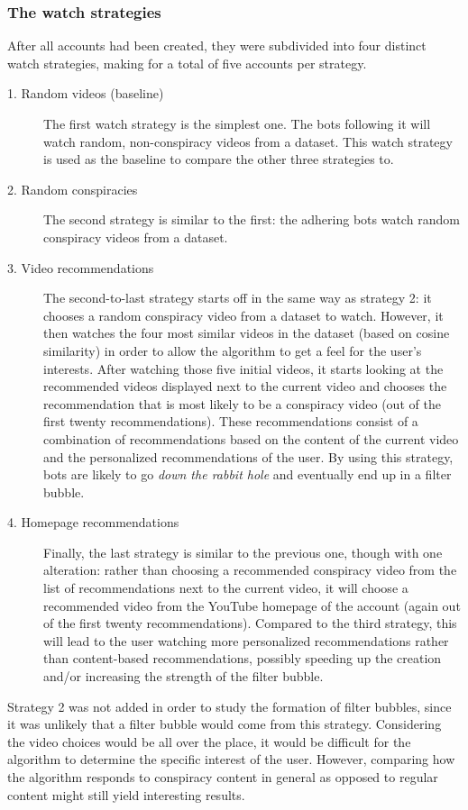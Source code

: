 \documentclass[../main.tex]{subfiles}
\begin{document}
\subsubsection{The watch strategies}
After all accounts had been created, they were subdivided into four distinct watch strategies, making for
a total of five accounts per strategy. 

\begin{description}
\item[1. Random videos (baseline)] The first watch strategy is the simplest one. The bots following 
it will watch random, non-conspiracy videos from a dataset. This watch strategy is used as the 
baseline to compare the other three strategies to.

\item[2. Random conspiracies] The second strategy is similar to the first: the 
adhering bots watch random conspiracy videos from a dataset. 

\item[3. Video recommendations] The second-to-last strategy starts off in the same way as strategy 2: it 
chooses a random conspiracy video from a dataset to watch. However, it then watches the four most similar 
videos in the dataset (based on cosine similarity) in order to allow the algorithm to get a feel for the 
user's interests. After watching those five initial videos, it starts looking at the recommended videos 
displayed next to the current video and chooses the recommendation that is most likely to be a conspiracy 
video (out of the first twenty recommendations). These recommendations consist of a combination of 
recommendations based on the content of the current video and the personalized recommendations of the 
user. By using this strategy, bots are likely to go \textit{down the rabbit hole} and eventually end up in
a filter bubble.

\item[4. Homepage recommendations] Finally, the last strategy is similar to the previous one, though
with one alteration: rather than choosing a recommended conspiracy video from the list of recommendations 
next to the current video, it will choose a recommended video from the YouTube homepage of the account 
(again out of the first twenty recommendations). Compared to the third strategy, this will lead to the user
watching more personalized recommendations rather than content-based recommendations, possibly speeding up 
the creation and/or increasing the strength of the filter bubble.

\end{description}
Strategy 2 was not added in order to study the formation of filter bubbles, since it was unlikely that a 
filter bubble would come from this strategy. Considering the video choices would be all over the place, it 
would be difficult for the algorithm to determine the specific interest of the user. However, comparing how 
the algorithm responds to conspiracy content in general as opposed to regular content might still yield 
interesting results.
\end{document}
